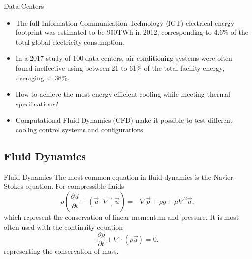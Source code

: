 \documentclass{beamer}
\begin{document}
\begin{frame}{Data Centers}
\begin{itemize}
\item The full Information Communication
Technology (ICT) electrical energy footprint was estimated to be 900TWh in
2012, corresponding to 4.6\% of the total global electricity
consumption\footnotemark.
\item In a 2017 study of 100 data centers, air conditioning systems were often found ineffective using between 21 to 61\% of the total facility energy, averaging at 38\%\footnotemark.
\item How to achieve the most energy efficient cooling while meeting thermal specifications?
\item Computational Fluid Dynamics (CFD) make it possible to test different cooling control systems and configurations.
\end{itemize}
\end{frame}

\subsection{Fluid Dynamics}
\begin{frame}{Fluid Dynamics}
The most common equation in fluid dynamics is the Navier-Stokes equation. For compressible fluids
\begin{equation}
\rho \left( \frac{\partial \vec{u}}{\partial t} + (\vec{u} \cdot \nabla) \vec{u} \right)
=
- \nabla \vec{p}
+ \rho g
+ \mu \nabla^2 \vec{u},
\end{equation}
which represent the conservation of linear momentum and pressure. It is most often used with the continuity equation
\begin{equation}
\frac{\partial \rho}{\partial t} + \nabla \cdot (\rho \vec{u}) = 0.
\end{equation}
representing the conservation of mass.
\end{frame}
\end{document}
